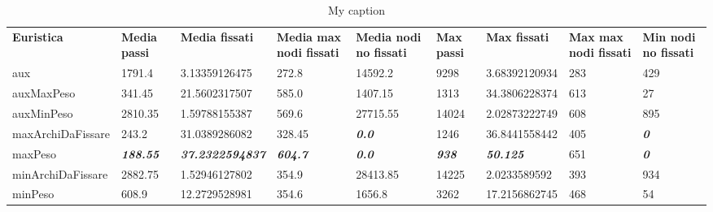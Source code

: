 \begin{table}[H]
\centering
\caption{My caption}
\label{my-label}
\begin{tabular}{lllllllll}
\textbf{Euristica}  & \textbf{Media passi}     & \textbf{Media fissati}          & \textbf{Media max nodi fissati} & \textbf{Media nodi no fissati} & \textbf{Max passi}    & \textbf{Max fissati}     & \textbf{Max max nodi fissati} & \textbf{Min nodi no fissati}             \\
aux                 & 1791.4                   & 3.13359126475                   & 272.8                           & 14592.2                        & 9298                  & 3.68392120934            & 283                           & 429                                      \\
auxMaxPeso          & 341.45                   & 21.5602317507                   & 585.0                           & 1407.15                        & 1313                  & 34.3806228374            & 613                           & 27                                       \\
auxMinPeso          & 2810.35                  & 1.59788155387                   & 569.6                           & 27715.55                       & 14024                 & 2.02873222749            & 608                           & 895                                      \\ \cline{9-9} 
maxArchiDaFissare   & 243.2                    & 31.0389286082                   & 328.45                          & \textit{\textbf{0.0}}          & 1246                  & 36.8441558442            & \multicolumn{1}{l|}{405}      & \multicolumn{1}{l|}{\textit{\textbf{0}}} \\ \cline{9-9} 
maxPeso             & \textit{\textbf{188.55}} & \textit{\textbf{37.2322594837}} & \textit{\textbf{604.7}}         & \textit{\textbf{0.0}}          & \textit{\textbf{938}} & \textit{\textbf{50.125}} & 651                           & \textit{\textbf{0}}                      \\
minArchiDaFissare   & 2882.75                  & 1.52946127802                   & 354.9                           & 28413.85                       & 14225                 & 2.0233589592             & 393                           & 934                                      \\
minPeso             & 608.9                    & 12.2729528981                   & 354.6                           & 1656.8                         & 3262                  & 17.2156862745            & 468                           & 54                                       \\

\end{tabular}
\end{table}
